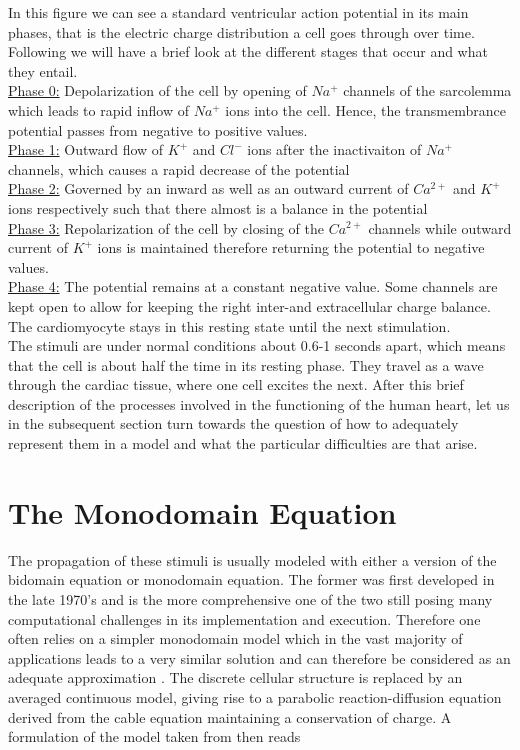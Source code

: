 \documentclass[../draft_1.tex]{subfiles}
\begin{document}
In this figure we can see a standard ventricular action potential in its main phases, that is the electric charge distribution a cell goes through over time. Following \cite{franzone2014mathematical} we will have a brief look at the different stages that occur and what they entail.
\smallskip
\\
\underline{Phase 0:} Depolarization of the cell by opening of $Na^+$ channels of the sarcolemma which leads to rapid inflow of $Na^+$ ions into the cell. Hence, the transmembrance potential passes from negative to positive values. \\
\underline{Phase 1:} Outward flow of $K^+$ and $Cl^-$ ions after the inactivaiton of $Na^+$ channels, which causes a rapid decrease of the potential \\
\underline{Phase 2:} Governed by an inward as well as an outward current of $Ca^{2+}$ and $K^+$ ions respectively such that there almost is a balance in the potential \\
\underline{Phase 3:} Repolarization of the cell by closing of the $Ca^{2+}$ channels while outward current of $K^+$ ions is maintained therefore returning the potential to negative values. \\
\underline{Phase 4:} The potential remains at a constant negative value. Some channels are kept open to allow for keeping the right inter-and extracellular charge balance. The cardiomyocyte stays in this resting state until the next stimulation. 
\smallskip
\\
The stimuli are under normal conditions about 0.6-1 seconds apart, which means that the cell is about half the time in its resting phase. They travel as a wave through the cardiac tissue, where one cell excites the next. After this brief description of the processes involved in the functioning of the human heart, let us in the subsequent section turn towards the question of how to adequately represent them in a model and what the particular difficulties are that arise.


\section{The Monodomain Equation}

The propagation of these stimuli is usually modeled with either a version of the bidomain equation or monodomain equation. The former was first developed in the late 1970's and is the more comprehensive one of the two still posing many computational challenges in its implementation and execution. Therefore one often relies on a simpler monodomain model which in the vast majority of applications leads to a very similar solution and can therefore be considered as an adequate approximation \cite{potse2006comparison}. The discrete cellular structure is replaced by an averaged continuous model, giving rise to a parabolic reaction-diffusion equation derived from the cable equation maintaining a conservation of charge. %
A formulation of the model taken from \cite{pezzuto2016space} then reads
\end{document}
